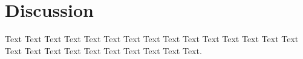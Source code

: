 \section{Discussion}

Text Text Text Text Text Text  Text Text Text Text Text Text Text Text Text  Text Text Text Text Text Text Text Text Text Text.

